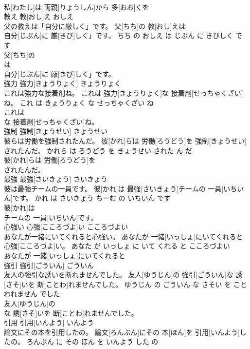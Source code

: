 \documentclass[8pt]{extreport}
\begin{document}
\begin{CJK}{UTF8}{min}
\\	私[わたし]は 両親[りょうしん]から 多[おお]くを
\\	教え	教[おし]え	おしえ	
\\	父の教えは「自分に厳しく」です。	父[ちち]の 教[おし]えは
\\	自分[じぶん]に 厳[きび]しく」です。	ちち の おしえ は じぶん に きびしく です	
\\	父[ちち]の
\\	は
\\	自分[じぶん]に 厳[きび]しく」です。			
\\	強力	強力[きょうりょく]	きょうりょく	
\\	これは強力な接着剤ね。	これは 強力[きょうりょく]な 接着剤[せっちゃくざい]ね。	これ は きょうりょく な せっちゃくざい ね	
\\	これは
\\	な 接着剤[せっちゃくざい]ね。			
\\	強制	強制[きょうせい]	きょうせい	
\\	彼らは労働を強制されたんだ。	彼[かれ]らは 労働[ろうどう]を 強制[きょうせい]されたんだ。	かれら は ろうどう を きょうせい された ん だ	
\\	彼[かれ]らは 労働[ろうどう]を
\\	されたんだ。			
\\	最強	最強[さいきょう]	さいきょう	
\\	彼は最強チームの一員です。	彼[かれ]は 最強[さいきょう]チームの 一員[いちいん]です。	かれ は さいきょう ちーむ の いちいん です	
\\	彼[かれ]は
\\	チームの 一員[いちいん]です。			
\\	心強い	心強[こころづよ]い	こころづよい	
\\	あなたが一緒にいてくれると心強い。	あなたが 一緒[いっしょ]にいてくれると 心強[こころづよ]い。	あなた が いっしょ に いて くれる と こころづよい	
\\	あなたが 一緒[いっしょ]にいてくれると
\\	強引	強引[ごういん]	ごういん	
\\	友人の強引な誘いを断れませんでした。	友人[ゆうじん]の 強引[ごういん]な 誘[さそ]いを 断[ことわ]れませんでした。	ゆうじん の ごういん な さそい を ことわれません でした	
\\	友人[ゆうじん]の
\\	な 誘[さそ]いを 断[ことわ]れませんでした。			
\\	引用	引用[いんよう]	いんよう	
\\	論文にその本を引用したの。	論文[ろんぶん]にその 本[ほん]を 引用[いんよう]したの。	ろんぶん に その ほん を いんよう した の	

\end{CJK}
\end{document}
